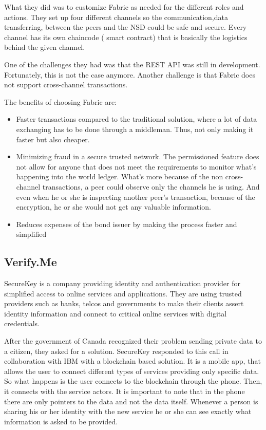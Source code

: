 \documentclass[a4paper,11pt]{report}
\begin{document}
	What they did was to customize Fabric as needed for the different roles and actions. They set up four different channels so the communication,data transferring, between the peers and the NSD could be safe and secure. Every channel has its own chaincode ( smart contract) that is basically the logistics behind the given channel.
	
	One of the challenges they had was that the REST API was still in development. Fortunately, this is not the case anymore. Another challenge is that Fabric does not support cross-channel transactions. \cite{altorosDemo}
	
The benefits of choosing Fabric are: 
\begin{itemize}
	
\item Faster transactions compared to the traditional solution, where a lot of data exchanging has to be done through a middleman. Thus, not only making it faster but also cheaper. 
\item Minimizing fraud in a secure trusted network. The permissioned feature does not allow for anyone that does not meet the requirements to monitor what’s happening into the world ledger. What’s more because of the non cross-channel transactions, a peer could observe only the channels he is using. And even when he or she is inspecting another peer’s transaction, because of the encryption, he or she would not get any valuable information. 
\item Reduces expenses of the bond issuer by making the process faster and simplified
	\end{itemize}

\subsection{Verify.Me}
\label{verifyMe}
SecureKey is a company providing identity and authentication provider for simplified access to online services and applications. They are using trusted providers such as banks, telcos and governments to make their clients assert identity information and connect to critical online services with digital credentials.

After the government of Canada recognized their problem sending private data to a citizen, they asked for a solution. SecureKey responded to this call in collaboration with IBM with a blockchain based solution. It is a mobile app, that allows the user to connect different types of services providing only specific data. So what happens is the user connects to the blockchain through the phone. Then, it connects with the service actors. It is important to note that in the phone there are only pointers to the data and not the data itself. Whenever a person is sharing his or her identity with the new service he or she can see exactly what information is asked to be provided. \cite{verifyMe}
\end{document}
